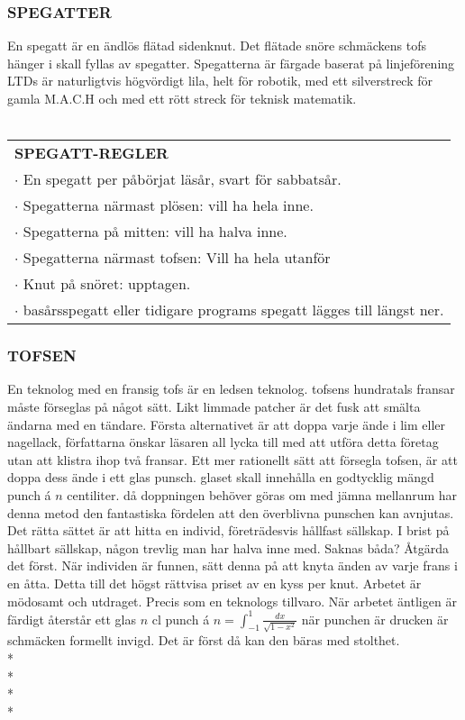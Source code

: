 \subsubsection*{\textbf{SPEGATTER}}
En spegatt är en ändlös flätad sidenknut. Det flätade snöre schmäckens tofs hänger i skall fyllas av spegatter.
Spegatterna är färgade baserat på linjeförening LTDs är naturligtvis högvördigt lila, helt för robotik, med ett silverstreck för gamla M.A.C.H och
med ett rött streck för teknisk matematik.\\\\
\begin{tabular}{p{\textwidth}}
    \textbf{SPEGATT-REGLER} \\
    $\cdot$ En spegatt per påbörjat läsår, svart för sabbatsår.\\
    $\cdot$ Spegatterna närmast plösen: vill ha hela inne.\\
    $\cdot$ Spegatterna på mitten: vill ha halva inne.\\
    $\cdot$ Spegatterna närmast tofsen: Vill ha hela utanför \\
    $\cdot$ Knut på snöret: upptagen.\\
    $\cdot$ basårsspegatt eller tidigare programs spegatt lägges till längst ner.\\
\end{tabular}

\subsubsection*{\textbf{TOFSEN}}
En teknolog med en fransig tofs är en ledsen teknolog. tofsens hundratals fransar måste förseglas på något sätt. Likt limmade patcher är det fusk att smälta
ändarna med en tändare. Första alternativet är att doppa varje ände i lim eller nagellack, författarna önskar läsaren all lycka till med att utföra detta
företag utan att klistra ihop två fransar. Ett mer rationellt sätt att försegla tofsen, är att doppa dess ände i ett glas punsch. glaset skall innehålla 
en godtycklig mängd punch á $n$ centiliter. då doppningen behöver göras om med jämna mellanrum har denna metod den fantastiska fördelen att den överblivna 
punschen kan avnjutas. Det rätta sättet är att hitta en individ, företrädesvis hållfast sällskap. I brist på hållbart sällskap, någon trevlig man har halva inne med.
Saknas båda? Åtgärda det först. När individen är funnen, sätt denna på att knyta änden av varje frans i en åtta. Detta till det högst rättvisa priset av en kyss per knut.
Arbetet är mödosamt och utdraget. Precis som en teknologs tillvaro. När arbetet äntligen är färdigt återstår ett glas $n$ cl punch á $n =\int_{-1}^{1} \frac{dx}{\sqrt{1-x^2}}$
när punchen är drucken är schmäcken formellt invigd. Det är först då kan den bäras med stolthet.\\*\\*
\\*
\\*

\newpage